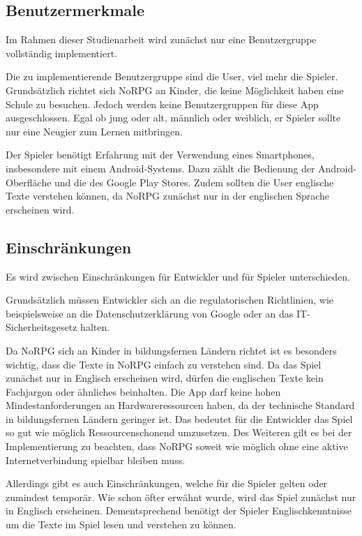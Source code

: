 	\subsection{Benutzermerkmale}
		Im Rahmen dieser Studienarbeit wird zunächst nur eine Benutzergruppe vollständig implementiert.
		
		Die zu implementierende Benutzergruppe sind die User, viel mehr die Spieler. Grundsätzlich richtet sich NoRPG an Kinder, die keine Möglichkeit haben eine Schule zu besuchen. Jedoch werden keine Benutzergruppen für diese App ausgeschlossen. Egal ob jung oder alt, männlich oder weiblich, er Spieler sollte nur eine Neugier zum Lernen mitbringen. 
		
		Der Spieler benötigt Erfahrung mit der Verwendung eines Smartphones, insbesondere mit einem Android-Systems. Dazu zählt die Bedienung der Android-Oberfläche und die des Google Play Stores. Zudem sollten die User englische Texte verstehen können, da NoRPG zunächst nur in der englischen Sprache erscheinen wird.
			
	\subsection{Einschränkungen}
		Es wird zwischen Einschränkungen für Entwickler und für Spieler unterschieden.
		
		Grundsätzlich müssen Entwickler sich an die regulatorischen Richtlinien, wie beispielsweise an die Datenschutzerklärung von Google oder an das IT-Sicherheitsgesetz halten.
		
		Da NoRPG sich an Kinder in bildungsfernen Ländern richtet ist es besonders wichtig, dass die Texte in NoRPG einfach zu verstehen sind. Da das Spiel zunächst nur in Englisch erscheinen wird, dürfen die englischen Texte kein Fachjargon oder ähnliches beinhalten. Die App darf keine hohen Mindestanforderungen an Hardwareressourcen haben, da der technische Standard in bildungsfernen Ländern geringer ist. Das bedeutet für die Entwickler das Spiel so gut wie möglich Ressourcenschonend umzusetzen. Des Weiteren gilt es bei der Implementierung zu beachten, dass NoRPG soweit wie möglich ohne eine aktive Internetverbindung spielbar bleiben muss.
		
		Allerdings gibt es auch Einschränkungen, welche für die Spieler gelten oder zumindest temporär. Wie schon öfter erwähnt wurde, wird das Spiel zunächst nur in Englisch erscheinen. Dementsprechend benötigt der Spieler Englischkenntnisse um die Texte im Spiel lesen und verstehen zu können.
		
